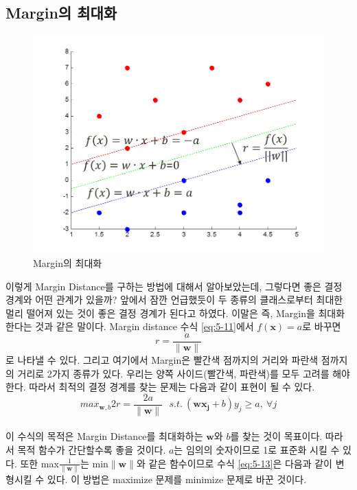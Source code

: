 \documentclass[a4paper]{oblivoir}
\begin{document}
\subsection{Margin의 최대화}
\begin{figure}[ht]\centering
\includegraphics[scale=0.5]{Maximizing_Margin}\caption{Margin의 최대화}\label{Fig:5-7}
\end{figure}
\indent 이렇게 Margin Distance를 구하는 방법에 대해서 알아보았는데, 그렇다면 좋은 결정 경계와 어떤 관계가 있을까? 앞에서 잠깐 언급했듯이 두 종류의 클래스로부터 최대한 멀리 떨어져 있는 것이 좋은 결정 경계가 된다고 하였다. 이말은 즉, Margin을 최대화 한다는 것과 같은 말이다. Margin distance 수식 \eqref{eq:5-11}에서 $f(\mathbf{x})=a$로 바꾸면 $$r=\frac{a}{\lVert \mathbf{w}\rVert}$$로 나타낼 수 있다. 그리고 여기에서 Margin은 빨간색 점까지의 거리와 파란색 점까지의 거리로 2가지 종류가 있다. 우리는 양쪽 사이드(빨간색, 파란색)를 모두 고려를 해야 한다. 따라서 최적의 결정 경계를 찾는 문제는 다음과 같이 표현이 될 수 있다.\\
\begin{equation}
max_{\mathbf{w},b} 2r=\frac{2a}{\lVert \mathbf{w}\rVert}\ \ \ s.t.\ (\mathbf{wx_j}+b)y_j\geq a,\ \forall j
\label{eq:5-12}
\end{equation}\\
이 수식의 목적은 Margin Distance를 최대화하는 $\mathbf{w}$와 $b$를 찾는 것이 목표이다. 따라서 목적 함수가 간단할수록 좋을 것이다. $a$는 임의의 숫자이므로 1로 표준화 시킬 수 있다. 또한 max$\frac{1}{\lVert \mathbf{w}\rVert}$는 min$\lVert \mathbf{w}\rVert$와 같은 함수이므로 수식 \eqref{eq:5-13}은 다음과 같이 변형시킬 수 있다. 이 방법은 maximize 문제를 minimize 문제로 바꾼 것이다.\\
\end{document}
